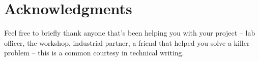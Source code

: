 \section*{Acknowledgments}

Feel free to briefly thank anyone that’s been helping you with your project – lab officer, the workshop, industrial partner, a friend that helped you solve a killer problem – this is a common courtesy in technical writing.